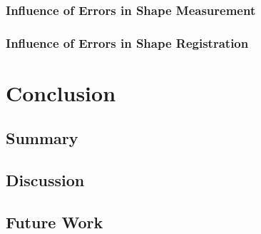 \documentclass[pdftex,12pt,a4paper]{report}
\begin{document}
\subsection{Influence of Errors in Shape Measurement}

\subsection{Influence of Errors in Shape Registration}

\chapter{Conclusion}

\section{Summary}

\section{Discussion}

\section{Future Work}

\listoffigures

\listoftables

\end{document}
